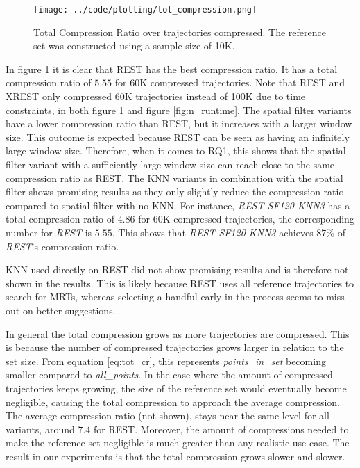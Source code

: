 \begin{figure}[h]
    \begin{minipage}{0.99\linewidth}
        \centering
        \texttt{[image: ../code/plotting/tot\_compression.png]}
        \caption{Total Compression Ratio over trajectories compressed. The reference set was constructed using a sample size of 10K.}
        \label{fig:n_compression}
    \end{minipage}
\end{figure}

In figure \ref{fig:n_compression} it is clear that REST has the best compression ratio. It has a total compression ratio of $5.55$ for 60K compressed trajectories. Note that REST and XREST only compressed 60K trajectories instead of 100K due to time constraints, in both figure \ref{fig:n_compression} and figure \ref{fig:n_runtime}. The spatial filter variants have a lower compression ratio than REST, but it increases with a larger window size. This outcome is expected because REST can be seen as having an infinitely large window size. Therefore, when it comes to RQ1, this shows that the spatial filter variant with a sufficiently large window size can reach close to the same compression ratio as REST. The KNN variants in combination with the spatial filter shows promising results as they only slightly reduce the compression ratio compared to spatial filter with no KNN. For instance, \textit{REST-SF120-KNN3} has a total compression ratio of $4.86$ for 60K compressed trajectories, the corresponding number for \textit{REST} is $5.55$. This shows that \textit{REST-SF120-KNN3} achieves 87\% of \textit{REST}'s compression ratio.

KNN used directly on REST did not show promising results and is therefore not shown in the results. This is likely because REST uses all reference trajectories to search for MRTs, whereas selecting a handful early in the process seems to miss out on better suggestions.

In general the total compression grows as more trajectories are compressed. This is because the number of compressed trajectories grows larger in relation to the set size. From equation \ref{eq:tot_cr}, this represents \textit{points\_in\_set} becoming smaller compared to \textit{all\_points}. In the case where the amount of compressed trajectories keeps growing, the size of the reference set would eventually become negligible, causing the total compression to approach the average compression. The average compression ratio (not shown), stays near the same level for all variants, around $7.4$ for REST. Moreover, the amount of compressions needed to make the reference set negligible is much greater than any realistic use case. The result in our experiments is that the total compression grows slower and slower.

